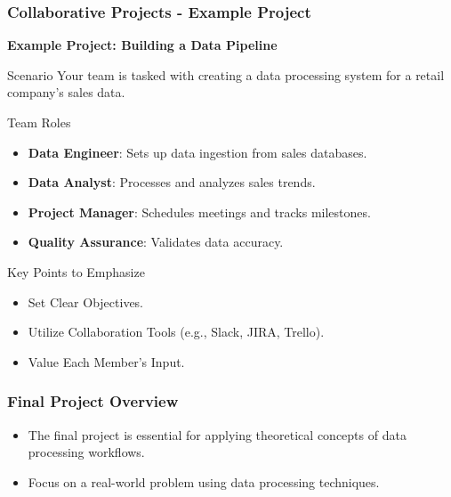 \documentclass[aspectratio=169]{beamer}
\begin{document}
\begin{frame}[fragile]
    \frametitle{Collaborative Projects - Example Project}
    \textbf{Example Project: Building a Data Pipeline}
    
    \begin{block}{Scenario}
        Your team is tasked with creating a data processing system for a retail company's sales data.
    \end{block}
    
    \begin{block}{Team Roles}
        \begin{itemize}
            \item \textbf{Data Engineer}: Sets up data ingestion from sales databases.
            \item \textbf{Data Analyst}: Processes and analyzes sales trends.
            \item \textbf{Project Manager}: Schedules meetings and tracks milestones.
            \item \textbf{Quality Assurance}: Validates data accuracy.
        \end{itemize}
    \end{block}
    
    \begin{block}{Key Points to Emphasize}
        \begin{itemize}
            \item Set Clear Objectives.
            \item Utilize Collaboration Tools (e.g., Slack, JIRA, Trello).
            \item Value Each Member's Input.
        \end{itemize}
    \end{block}
\end{frame}

\begin{frame}[fragile]
    \frametitle{Final Project Overview}
    \begin{itemize}
        \item The final project is essential for applying theoretical concepts of data processing workflows.
        \item Focus on a real-world problem using data processing techniques.
    \end{itemize}
\end{frame}
\end{document}
